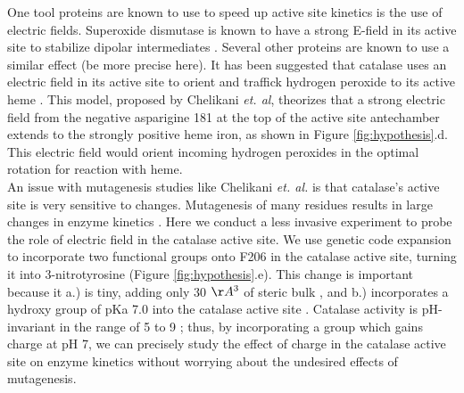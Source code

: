\documentclass[journal=jacsat,manuscript=article]{achemso}
\begin{document}
One tool proteins are known to use to speed up active site kinetics is the use of electric fields. Superoxide dismutase is known to have a strong E-field in its active site to stabilize dipolar intermediates \cite{conserved-as-efield-sod, concentrated-as-efield-sod}. Several other proteins are known to use a similar effect \cite{efield-review} (be more precise here). It has been suggested that catalase uses an electric field in its active site to orient and traffick hydrogen peroxide to its active heme \cite{electricpotential}. This model, proposed by Chelikani \textit{et. al}, theorizes that a strong electric field from the negative asparigine 181 at the top of the active site antechamber extends to the strongly positive heme iron, as shown in Figure \ref{fig:hypothesis}.d. This electric field would orient incoming hydrogen peroxides in the optimal rotation for reaction with heme.\\

An issue with mutagenesis studies like Chelikani \textit{et. al.} is that catalase's active site is very sensitive to changes. Mutagenesis of many residues results in large changes in enzyme kinetics \cite{substrateflow}. Here we conduct a less invasive experiment to probe the role of electric field in the catalase active site. We use genetic code expansion \cite{hammill} to incorporate two functional groups onto F206 in the catalase active site, turning it into 3-nitrotyrosine (Figure \ref{fig:hypothesis}.e). This change is important because it a.) is tiny, adding only 30 $\AA^3$ of steric bulk \cite{3ntsize}, and b.) incorporates a hydroxy group of pKa 7.0 into the catalase active site \cite{3ntsize}. Catalase activity is pH-invariant in the range of 5 to 9 \cite{phdependence,kcatkm}; thus, by incorporating a group which gains charge at pH 7, we can precisely study the effect of charge in the catalase active site on enzyme kinetics without worrying about the undesired effects of mutagenesis.\\
\end{document}
